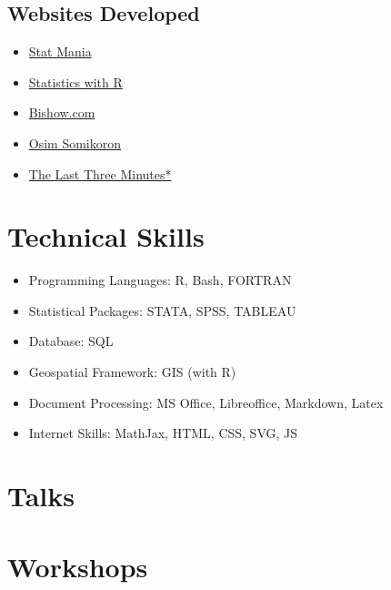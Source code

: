 \documentclass[
]{book}
\providecommand{\tightlist}{%
  \setlength{\itemsep}{0pt}\setlength{\parskip}{0pt}}
\begin{document}
\hypertarget{websites-developed}{%
\section*{Websites Developed}\label{websites-developed}}

\begin{itemize}
\tightlist
\item
  \href{https://www.statmania.info}{Stat Mania}
\item
  \href{https://rstat.statmania.info}{Statistics with R}
\item
  \href{https://www.bishwo.com}{Bishow.com}
\item
  \href{https://os.statmania.info}{Osim Somikoron}
\item
  \href{https://l3m.bishwo.com/}{The Last Three Minutes*}
\end{itemize}

\hypertarget{technical-skills}{%
\chapter*{Technical Skills}\label{technical-skills}}

\begin{itemize}
\tightlist
\item
  Programming Languages: R, Bash, FORTRAN
\item
  Statistical Packages: STATA, SPSS, TABLEAU
\item
  Database: SQL
\item
  Geospatial Framework: GIS (with R)
\item
  Document Processing: MS Office, Libreoffice, Markdown, Latex
\item
  Internet Skills: MathJax, HTML, CSS, SVG, JS
\end{itemize}

\hypertarget{talks}{%
\chapter*{Talks}\label{talks}}

\hypertarget{workshops}{%
\chapter*{Workshops}\label{workshops}}
\end{document}
